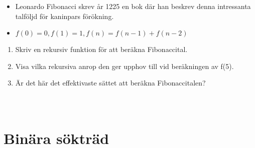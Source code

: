 \begin{frame}
  \begin{exercise}[Fibonacci]
    \begin{itemize}
      \item Leonardo Fibonacci skrev år 1225 en bok där han beskrev denna 
        intressanta talföljd för kaninpars förökning.
      \item \(f(0) = 0, f(1) = 1, f(n) = f(n-1)+f(n-2)\)
    \end{itemize}
    \begin{enumerate}
      \item Skriv en rekursiv funktion för att beräkna Fibonaccital.
      \item Visa vilka rekursiva anrop den ger upphov till vid beräkningen av 
        f(5).
      \item Är det här det effektivaste sättet att beräkna Fibonaccitalen?
    \end{enumerate}
  \end{exercise}
\end{frame}

\begin{frame}[fragile]
  \begin{solution}
    \inputminted{python}{src/fib.py}
  \end{solution}
\end{frame}

\begin{frame}[fragile]
  \begin{solution}
    \inputminted{python}{src/fib_print.py}
  \end{solution}
\end{frame}

\begin{frame}[fragile]
  \begin{solution}
    \inputminted{python}{src/fib_efficient.py}
  \end{solution}
\end{frame}

\section{Binära sökträd}

